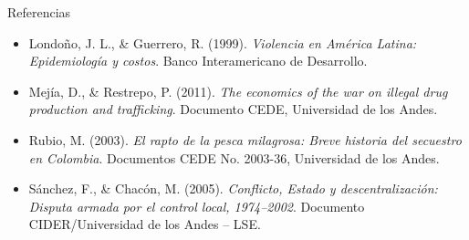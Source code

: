 \documentclass[aspectratio=169,xcolor=dvipsnames, t]{beamer}
\begin{document}
\begin{frame}{Referencias}
\begin{itemize}
    \item Londoño, J. L., \& Guerrero, R. (1999). \textit{Violencia en América Latina: Epidemiología y costos}. Banco Interamericano de Desarrollo.

    \item Mejía, D., \& Restrepo, P. (2011). \textit{The economics of the war on illegal drug production and trafficking}. Documento CEDE, Universidad de los Andes.

    \item Rubio, M. (2003). \textit{El rapto de la pesca milagrosa: Breve historia del secuestro en Colombia}. Documentos CEDE No. 2003-36, Universidad de los Andes.

    \item Sánchez, F., \& Chacón, M. (2005). \textit{Conflicto, Estado y descentralización: Disputa armada por el control local, 1974–2002}. Documento CIDER/Universidad de los Andes – LSE.

\end{itemize}
\end{frame}
\end{document}
